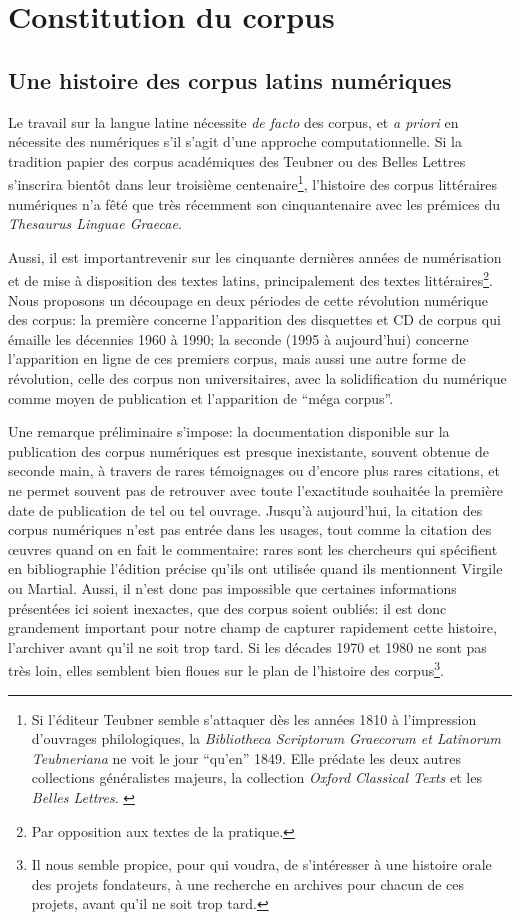 \chapter{Constitution du corpus}

\section{Une histoire des corpus latins numériques}

Le travail sur la langue latine nécessite \textit{de facto} des corpus, et \textit{a priori} en nécessite des numériques s'il s'agit d'une approche computationnelle. Si la tradition papier des corpus académiques des Teubner ou des Belles Lettres s'inscrira bientôt dans leur troisième centenaire\footnote{Si l'éditeur Teubner semble s'attaquer dès les années 1810 à l'impression d'ouvrages philologiques, la \textit{Bibliotheca Scriptorum Graecorum et Latinorum Teubneriana} ne voit le jour \enquote{qu'en} 1849. Elle prédate les deux autres collections généralistes majeurs, la collection \textit{Oxford Classical Texts} et les \textit{Belles Lettres}. \cite{andre_cent-cinquante_1974}}, l'histoire des corpus littéraires numériques n'a fêté que très récemment son cinquantenaire avec les prémices du \textit{Thesaurus Linguae Graecae}.

Aussi, il est importantrevenir sur les cinquante dernières années de numérisation et de mise à disposition des textes latins, principalement des textes littéraires\footnote{Par opposition aux textes de la pratique.}. Nous proposons un découpage en deux périodes de cette révolution numérique des corpus: la première concerne l'apparition des disquettes et CD de corpus qui émaille les décennies 1960 à 1990; la seconde (1995 à aujourd'hui) concerne l'apparition en ligne de ces premiers corpus, mais aussi une autre forme de révolution, celle des corpus non universitaires, avec la solidification du numérique comme moyen de publication et l'apparition de \enquote{méga corpus}.

Une remarque préliminaire s'impose: la documentation disponible sur la publication des corpus numériques est presque inexistante, souvent obtenue de seconde main, à travers de rares témoignages ou d'encore plus rares citations, et ne permet souvent pas de retrouver avec toute l'exactitude souhaitée la première date de publication de tel ou tel ouvrage. Jusqu'à aujourd'hui, la citation des corpus numériques n'est pas entrée dans les usages, tout comme la citation des œuvres quand on en fait le commentaire: rares sont les chercheurs qui spécifient en bibliographie l'édition précise qu'ils ont utilisée quand ils mentionnent Virgile ou Martial. Aussi, il n'est donc pas impossible que certaines informations présentées ici soient inexactes, que des corpus soient oubliés: il est donc grandement important pour notre champ de capturer rapidement cette histoire, l'archiver avant qu'il ne soit trop tard. Si les décades 1970 et 1980 ne sont pas très loin, elles semblent bien floues sur le plan de l'histoire des corpus\footnote{Il nous semble propice, pour qui voudra, de s'intéresser à une histoire orale des projets fondateurs, à une recherche en archives pour chacun de ces projets, avant qu'il ne soit trop tard.}.

